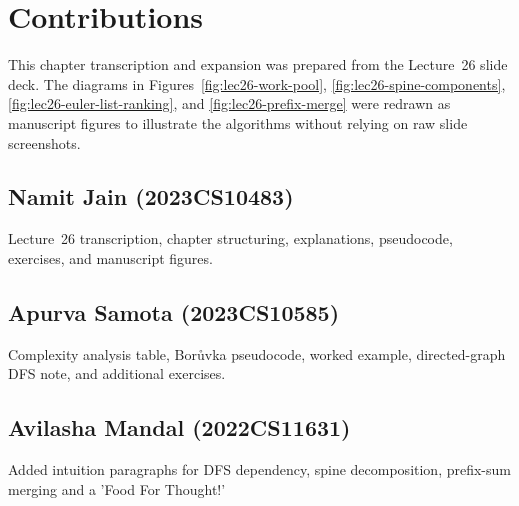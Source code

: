 \section*{Contributions}

This chapter transcription and expansion was prepared from the Lecture~26 slide deck.
The diagrams in Figures~\ref{fig:lec26-work-pool}, \ref{fig:lec26-spine-components}, \ref{fig:lec26-euler-list-ranking}, and \ref{fig:lec26-prefix-merge} were redrawn as manuscript figures to illustrate the algorithms without relying on raw slide screenshots.

\subsection*{Namit Jain (2023CS10483)}
Lecture~26 transcription, chapter structuring, explanations, pseudocode, exercises, and manuscript figures.

\subsection*{Apurva Samota (2023CS10585)}
Complexity analysis table, Borůvka pseudocode, worked example, directed-graph DFS note, and additional exercises.

\subsection*{Avilasha Mandal (2022CS11631)}
Added intuition paragraphs for DFS dependency, spine decomposition, prefix-sum merging and a 'Food For Thought!'
